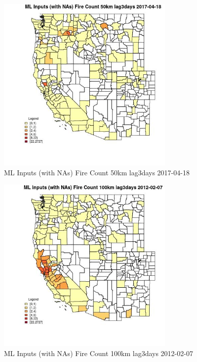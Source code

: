 \begin{figure} 
\centering  
\includegraphics[width=0.77\textwidth]{Code_Outputs/Report_ML_input_PM25_Step4_part_f_de_duplicated_aves_prioritize_24hr_obswNAs_CountyFire_Count_50km_lag3daysMean2017-04-18.jpg} 
\caption{\label{fig:Report_ML_input_PM25_Step4_part_f_de_duplicated_aves_prioritize_24hr_obswNAsCountyFire_Count_50km_lag3daysMean2017-04-18}ML Inputs (with NAs) Fire Count 50km lag3days 2017-04-18} 
\end{figure} 
 

\begin{figure} 
\centering  
\includegraphics[width=0.77\textwidth]{Code_Outputs/Report_ML_input_PM25_Step4_part_f_de_duplicated_aves_prioritize_24hr_obswNAs_CountyFire_Count_100km_lag3daysMean2012-02-07.jpg} 
\caption{\label{fig:Report_ML_input_PM25_Step4_part_f_de_duplicated_aves_prioritize_24hr_obswNAsCountyFire_Count_100km_lag3daysMean2012-02-07}ML Inputs (with NAs) Fire Count 100km lag3days 2012-02-07} 
\end{figure} 
 

